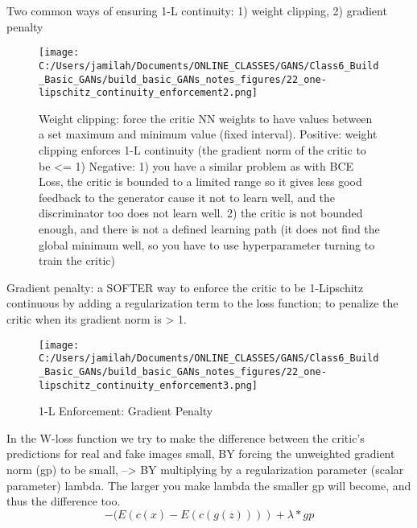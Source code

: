 \documentclass[11pt, onecolumn]{article}
\begin{document}
Two common ways of ensuring 1-L continuity: 1) weight clipping, 2) gradient penalty
\begin{figure}[htp]
\begin{center}
\texttt{[image: C:/Users/jamilah/Documents/ONLINE\_CLASSES/GANS/Class6\_Build\_Basic\_GANs/build\_basic\_GANs\_notes\_figures/22\_one-lipschitz\_continuity\_enforcement2.png]}
\end{center}
\caption{Weight clipping: force the critic NN weights to have values between a set maximum and minimum value (fixed interval). Positive: weight clipping enforces 1-L continuity (the gradient norm of the critic to be <= 1)
Negative: 1) you have a similar problem as with BCE Loss, the critic is bounded to a limited range so it gives less good feedback to the generator cause it not to learn well, and the discriminator too does not learn well. 2) the critic is not bounded enough, and there is not a defined learning path (it does not find the global minimum well, so you have to use hyperparameter turning to train the critic)}
\label{22_one-lipschitz_continuity_enforcement2}
\end{figure}


Gradient penalty: a SOFTER way to enforce the critic to be 1-Lipschitz continuous by adding a regularization term to the loss function; to penalize the critic when its gradient norm is > 1.
\begin{figure}[htp]
\begin{center}
\texttt{[image: C:/Users/jamilah/Documents/ONLINE\_CLASSES/GANS/Class6\_Build\_Basic\_GANs/build\_basic\_GANs\_notes\_figures/22\_one-lipschitz\_continuity\_enforcement3.png]}
\end{center}
\caption{1-L Enforcement: Gradient Penalty}
\label{22_one-lipschitz_continuity_enforcement3}
\end{figure}

In the W-loss function we try to make the difference between the critic's predictions for real and fake images small, BY forcing the unweighted gradient norm (gp) to be small, --> BY multiplying by a regularization parameter (scalar parameter) lambda.  The larger you make lambda the smaller gp will become, and thus the difference too.
\begin{equation}
-(E(c(x) - E(c(g(z)))) + \lambda*gp
\end{equation}
\end{document}
